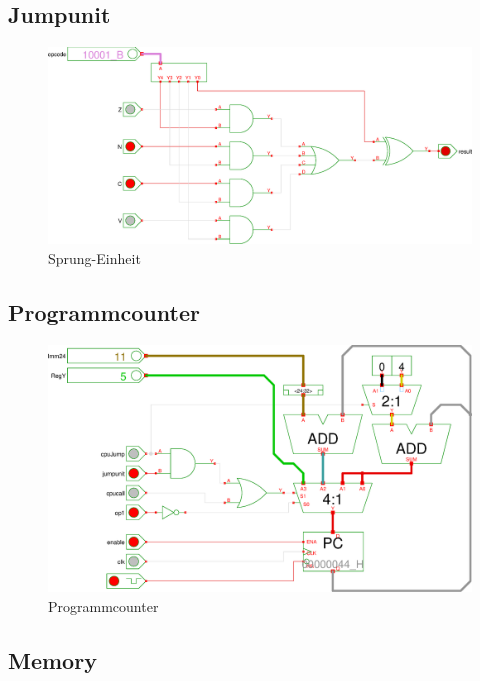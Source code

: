 \subsection{Jumpunit}
\begin{figure}[h]
\centering
\includegraphics[width=1\textwidth]{images/ju.eps}
\caption{\label{HW:JU}Sprung-Einheit}
\end{figure}
\subsection{Programmcounter}
\begin{figure}[h]
\centering
\includegraphics[width=1\textwidth]{images/pc.eps}
\caption{\label{HW:PC}Programmcounter}
\end{figure}
\subsection{Memory}
